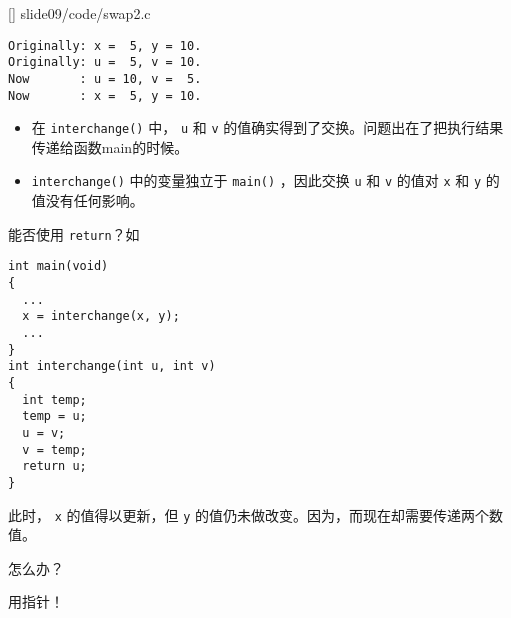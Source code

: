 \begin{frame}\ft{\secname}
  
  []
  {slide09/code/swap2.c}
\end{frame}

\begin{frame}[fragile]\ft{\secname}
\begin{lstlisting}[backgroundcolor=\color{red!10}]
Originally: x =  5, y = 10.
Originally: u =  5, v = 10.
Now       : u = 10, v =  5.
Now       : x =  5, y = 10.
\end{lstlisting}
\pause \vspace{0.1in}

\begin{itemize}
\item
在 \lstinline|interchange()| 中， \lstinline|u| 和 \lstinline|v| 的值确实得到了交换。问题出在了把执行结果传递给函数main的时候。\\[0.1in]
\item
  \lstinline|interchange()| 中的变量独立于 \lstinline|main()| ，因此交换 \lstinline|u| 和 \lstinline|v| 的值对 \lstinline|x| 和 \lstinline|y| 的值没有任何影响。
\end{itemize}

\end{frame}

\begin{frame}[fragile]\ft{\secname}
能否使用 \lstinline|return|？如
\begin{lstlisting}[backgroundcolor=\color{red!10}]
int main(void)
{
  ...
  x = interchange(x, y);
  ...
}
int interchange(int u, int v)
{
  int temp;
  temp = u;
  u = v;
  v = temp;
  return u;
}
\end{lstlisting}
\end{frame}

\begin{frame}[fragile]\ft{\secname}
此时， \lstinline|x| 的值得以更新，但 \lstinline|y| 的值仍未做改变。因为，而现在却需要传递两个数值。
\pause \vspace{0.1in}

\begin{center}
{\Large 怎么办？}
\end{center}
\pause\vspace{0.1in}

\begin{center}
{\Large 用指针！} 
\end{center}
\end{frame}
